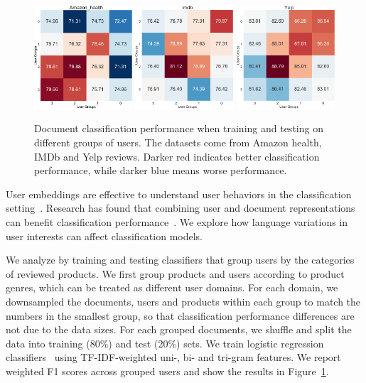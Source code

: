 \begin{figure}[t]
\centering
\includegraphics[width=0.325\textwidth]{./images/chapter4/uembedding/amazon_health_group.pdf}
\includegraphics[width=0.325\textwidth]{./images/chapter4/uembedding/imdb_group.pdf}
\includegraphics[width=0.325\textwidth]{./images/chapter4/uembedding/yelp_group.pdf}
\caption{Document classification performance when training and testing on different groups of users. The datasets come from Amazon health, IMDb and Yelp reviews. Darker red indicates better classification performance, while darker blue means worse performance.}
\label{chap4:fig:group}
\end{figure}

User embeddings are effective to understand user behaviors in the classification setting~\cite{amir2016modelling, ding2018predicting}.
Research has found that combining user and document representations can benefit classification performance~\cite{yuan2019neural}.
We explore how language variations in user interests can affect classification models.

We analyze by training and testing classifiers that group users by the categories of reviewed products.
We first group products and users according to product genres, which can be treated as different user domains. 
For each domain, we downsampled the documents, users and products within each group to match the numbers in the smallest group, so that classification performance differences are not due to the data sizes.
For each grouped documents, we shuffle and split the data into training (80\%) and test (20\%) sets. We train logistic regression classifiers~\cite{pedregosa2011scikit} using TF-IDF-weighted uni-, bi- and tri-gram features. 
We report weighted F1 scores across grouped users and show the results in Figure~\ref{chap4:fig:group}.


